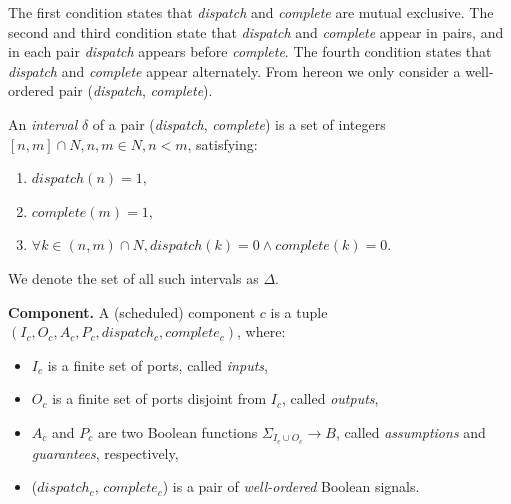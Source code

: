 The first condition states that \emph{dispatch} and \emph{complete} are mutual exclusive. The second and third condition state that \emph{dispatch} and \emph{complete} appear in pairs, and in each pair \emph{dispatch} appears before \emph{complete}. The fourth condition states that \emph{dispatch} and \emph{complete} appear alternately. 
From hereon we only consider a well-ordered pair (\emph{dispatch}, \emph{complete}).

An \emph{interval} $\delta$ of a pair (\emph{dispatch}, \emph{complete}) is a set of integers $[n, m] \cap N, n,m \in N, n < m$, satisfying:

\begin{enumerate}
	\item $ dispatch(n) = 1 $, 
	\item $ complete(m) = 1 $, 
	\item $ \forall k\in (n, m) \cap N, dispatch(k)=0 \wedge complete(k)=0 $.
\end{enumerate}

We denote the set of all such intervals as $\Delta$.

{\bf Component.}
A (scheduled) component $c$ is a tuple $(I_c, O_c, A_c, P_c, dispatch_c, complete_c)$, where: 

\begin{itemize}
    	\item $I_c$ is a finite set of ports, called \emph{inputs},
    	\item $O_c$ is a finite set of ports disjoint from $I_c$, called \emph{outputs},
	\item $A_c$ and $P_c$ are two Boolean functions $\Sigma_{I_c \cup O_c} \rightarrow B$, called \emph{assumptions} and \emph{guarantees}, respectively,	
    	\item ($dispatch_c$, $complete_c$) is a pair of \emph{well-ordered} Boolean signals.
\end{itemize}

